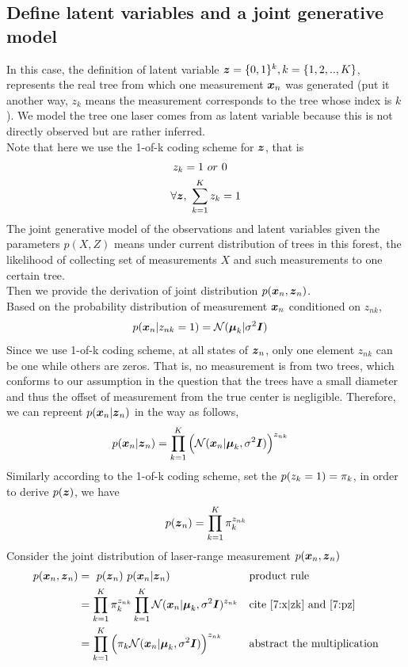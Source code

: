 \documentclass[11pt,a4paper]{article}
\newcommand{\htab}{\hspace*{0.63cm}}
\newcommand{\bs}[1]{\boldsymbol{#1}}
\newcommand{\bmu}{\boldsymbol{\mu}}
\newcommand{\N}{\mathcal{N}}
\begin{document}
\subsection{Define latent variables and a joint generative model}
\htab In this case, the definition of latent variable $\z = \{0, 1\}^{k}, k = \{1,2,..,K\}$,
represents the real tree from which one measurement $\xn$ was generated (put it another way,
$z_{k}$ means the measurement corresponds to the tree whose index is $k$). 
 We model the tree one laser comes from as latent variable 
because this is not directly observed but are rather inferred.\\
\htab Note that here we use the 1-of-k coding scheme for $\z$, that is 
\begin{align}
    z_{k} &= 1\ or\ 0 \\
    \forall \z &,\ \sumk z_{k} = 1
    \end{align}
\htab The joint generative model of the observations and latent variables 
given the parameters $p(X,Z)$ means under current distribution of trees in this forest, 
 the likelihood of collecting set of measurements $X$ and such measurements to
 one certain tree. \\ 
 \htab Then we provide the derivation of joint distribution $p(\xn,\zn)$. \\
\htab Based on the probability distribution of measurement $\xn$ conditioned on $z_{nk}$, 
    \begin{align}
        p(\xn | z_{nk} = 1) 
        &= \N(\bmu_{k} | \sigma^{2} \bs{I})
    \end{align}
\htab Since we use 1-of-k coding scheme, at all states of $\zn$, only one element $z_{nk}$ can be one while
others are zeros. That is, no measurement is from two trees, which conforms to our assumption in the question
that the trees have a small diameter and thus the offset of measurement from the true center is negligible.
Therefore, we can repreent $p(\xn | \zn)$ in the way as follows,
\begin{align}
    p(\xn | \zn) &= \prodk \Big( \Nxn \Big)^{z_{nk}} \label{7:x|zk}
    \end{align}
\htab Similarly according to the 1-of-k coding scheme, set the $p(z_{k} = 1) = \pi_{k}$,
in order to derive $p(\z)$, we have
    \begin{align}
        p(\zn) = \prodk \pk^{z_{nk}} \label{7:pz}
    \end{align}
\htab Consider the joint distribution of laser-range measurement $p(\xn, \zn)$
    \begin{align}
        p(\xn, \zn) 
        &= \ p(\zn)\ p(\xn | \zn)  &&\mbox{product rule} \\
        &=  \prodk \pk^{z_{nk}} \prodk \Nxn ^{z_{nk}} 
        &&\mbox{cite \eqref{7:x|zk} and \eqref{7:pz}} \\
        &= \prodk \Big(  \pk  \Nxn  \Big)^{z_{nk}}
        &&\mbox{abstract the multiplication}
    \end{align}
\end{document}
